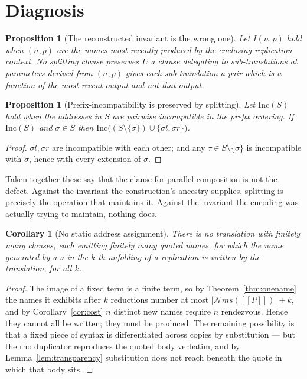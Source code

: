 \documentclass[11pt]{article}
\theoremstyle{definition}
\theoremstyle{plain}
\newtheorem{proposition}[definition]{Proposition}
\newtheorem{corollary}[definition]{Corollary}
\theoremstyle{remark}
\newcommand{\enc}[1]{[\![#1]\!]}
\newcommand{\nms}{\mathcal{N}\!\mathit{ms}}
\begin{document}
\section{Diagnosis}\label{sec:diagnosis}

\begin{proposition}[The reconstructed invariant is the wrong one]
\label{prop:wronginv}
Let $I(n,p)$ hold when $(n,p)$ are the names most recently produced by
the enclosing replication context. No splitting clause preserves $I$: a
clause delegating to sub-translations at parameters derived from $(n,p)$
gives each sub-translation a pair which is a function of the most recent
output and not that output.
\end{proposition}

\begin{proposition}[Prefix-incompatibility is preserved by splitting]
\label{prop:rightinv}
Let $\mathrm{Inc}(S)$ hold when the addresses in $S$ are pairwise
incompatible in the prefix ordering. If $\mathrm{Inc}(S)$ and
$\sigma \in S$ then
$\mathrm{Inc}\big((S \setminus \{\sigma\}) \cup \{\sigma l, \sigma r\}\big)$.
\end{proposition}

\begin{proof}
$\sigma l, \sigma r$ are incompatible with each other; and any $\tau \in
S\setminus\{\sigma\}$ is incompatible with $\sigma$, hence with every
extension of $\sigma$.
\end{proof}

Taken together these say that the clause for parallel composition is not
the defect. Against the invariant the construction's ancestry supplies,
splitting is precisely the operation that maintains it. Against the
invariant the encoding was actually trying to maintain, nothing does.

\begin{corollary}[No static address assignment]\label{cor:nogo}
There is no translation with finitely many clauses, each emitting
finitely many quoted names, for which the name generated by a $\nu$ in the
$k$-th unfolding of a replication is written by the translation, for all
$k$.
\end{corollary}

\begin{proof}
The image of a fixed term is a finite term, so by
Theorem~\ref{thm:onename} the names it exhibits after $k$ reductions
number at most $|\nms(\enc{P})| + k$, and by
Corollary~\ref{cor:cost} $n$ distinct new names require $n$ rendezvous.
Hence they cannot all be written; they must be produced. The remaining
possibility is that a fixed piece of syntax is differentiated across
copies by substitution --- but the rho duplicator reproduces the quoted
body verbatim, and by Lemma~\ref{lem:transparency} substitution does not
reach beneath the quote in which that body sits.
\end{proof}
\end{document}
